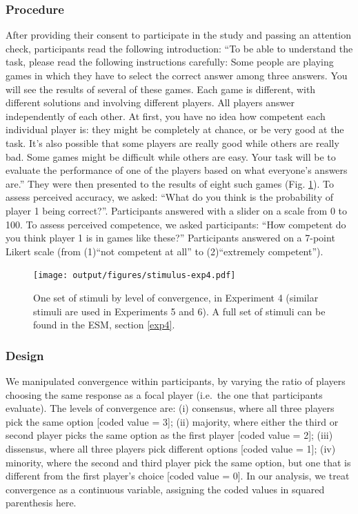 \documentclass[
  doc,floatsintext]{apa6}
\begin{document}
\subsubsection{Procedure}\label{procedure-2}

After providing their consent to participate in the study and passing an attention check, participants read the following introduction: ``To be able to understand the task, please read the following instructions carefully: Some people are playing games in which they have to select the correct answer among three answers. You will see the results of several of these games. Each game is different, with different solutions and involving different players. All players answer independently of each other. At first, you have no idea how competent each individual player is: they might be completely at chance, or be very good at the task. It's also possible that some players are really good while others are really bad. Some games might be difficult while others are easy. Your task will be to evaluate the performance of one of the players based on what everyone's answers are.'' They were then presented to the results of eight such games (Fig. \ref{fig:stimulus-exp4}). To assess perceived accuracy, we asked: ``What do you think is the probability of player 1 being correct?''. Participants answered with a slider on a scale from 0 to 100. To assess perceived competence, we asked participants: ``How competent do you think player 1 is in games like these?'' Participants answered on a 7-point Likert scale (from (1)``not competent at all'' to (2)``extremely competent'').



\begin{figure}
\centering
\texttt{[image: output/figures/stimulus-exp4.pdf]}
\caption{\label{fig:stimulus-exp4}One set of stimuli by level of convergence, in Experiment 4 (similar stimuli are used in Experiments 5 and 6). A full set of stimuli can be found in the ESM, section \ref{exp4}.}
\end{figure}

\subsubsection{Design}\label{design-3}

We manipulated convergence within participants, by varying the ratio of players choosing the same response as a focal player (i.e.~the one that participants evaluate). The levels of convergence are: (i) consensus, where all three players pick the same option {[}coded value = 3{]}; (ii) majority, where either the third or second player picks the same option as the first player {[}coded value = 2{]}; (iii) dissensus, where all three players pick different options {[}coded value = 1{]}; (iv) minority, where the second and third player pick the same option, but one that is different from the first player's choice {[}coded value = 0{]}. In our analysis, we treat convergence as a continuous variable, assigning the coded values in squared parenthesis here.
\end{document}
